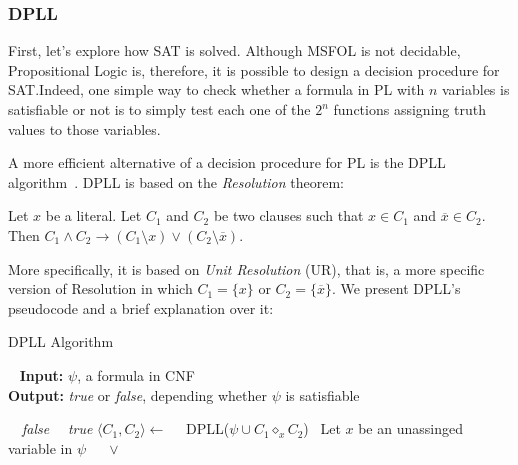 \subsubsection{DPLL}

First, let’s explore how SAT is solved. Although MSFOL is not decidable, Propositional Logic is, therefore, it is possible to design a decision procedure for SAT.\@ Indeed, one simple way to check whether a formula in PL with $n$ variables is satisfiable or not is to simply test each one of the $2^{n}$ functions assigning truth values to those variables.

A more efficient alternative of a decision procedure for PL is the DPLL algorithm~\cite{dpll}. DPLL is based on the \textit{Resolution} theorem:

\begin{theorem}[Resolution]
Let $x$ be a literal. Let $C_{1}$ and $C_{2}$ be two clauses such that $x \in C_{1}$ and $\overline x \in C_{2}$. Then $C_{1} \wedge C_{2} \rightarrow (C_{1} \setminus x) \vee (C_{2} \setminus \overline x)$.
\end{theorem}

More specifically, it is based on \textit{Unit Resolution} (UR), that is, a more specific version of Resolution in which $C_{1} = \{x\}$ or $C_{2} = \{\overline x\}$. We present DPLL's pseudocode and a brief explanation over it:

\begin{algorithm}[H]
\caption{DPLL Algorithm}~\label{dpllAlgo}
    \hspace*{\algorithmicindent} \textbf{Input:} $\psi$, a formula in CNF \\
    \hspace*{\algorithmicindent} \textbf{Output:} \textit{true} or \textit{false}, depending whether $\psi$ is satisfiable
\begin{algorithmic}
  \State~\Return~\textit{false}
  \State~\Return~\textit{true}
\Else
    \State $\langle C_{1}, C_{2} \rangle \gets$  
    \State~\Return~DPLL($\psi \cup C_{1} \diamond_{x} C_{2}$)
  \Else
    \State~Let $x$ be an unassinged variable in $\psi$
    \State~\Return~ $\vee$ 
  \EndIf
\EndIf
\EndFunction
\end{algorithmic}
\end{algorithm}

